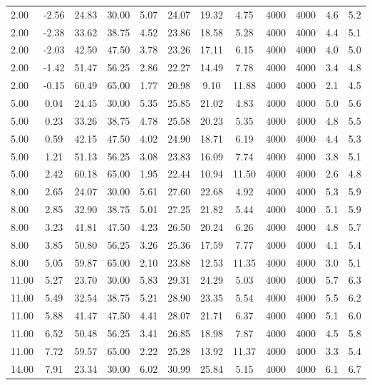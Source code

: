 \documentclass[english]{SPFShortReport}
\begin{document}
\begin{table}[!ht]
\begin{small}
\begin{center}
{\begin{tabular}{l | c c c c c c c c c c c }
2.00 & -2.56 & 24.83 & 30.00 & 5.07 & 24.07 & 19.32 & 4.75 & 4000 & 4000 & 4.6 & 5.2\\ 
2.00 & -2.38 & 33.62 & 38.75 & 4.52 & 23.86 & 18.58 & 5.28 & 4000 & 4000 & 4.4 & 5.1\\ 
2.00 & -2.03 & 42.50 & 47.50 & 3.78 & 23.26 & 17.11 & 6.15 & 4000 & 4000 & 4.0 & 5.0\\ 
2.00 & -1.42 & 51.47 & 56.25 & 2.86 & 22.27 & 14.49 & 7.78 & 4000 & 4000 & 3.4 & 4.8\\ 
2.00 & -0.15 & 60.49 & 65.00 & 1.77 & 20.98 & 9.10 & 11.88 & 4000 & 4000 & 2.1 & 4.5\\ 
5.00 & 0.04 & 24.45 & 30.00 & 5.35 & 25.85 & 21.02 & 4.83 & 4000 & 4000 & 5.0 & 5.6\\ 
5.00 & 0.23 & 33.26 & 38.75 & 4.78 & 25.58 & 20.23 & 5.35 & 4000 & 4000 & 4.8 & 5.5\\ 
5.00 & 0.59 & 42.15 & 47.50 & 4.02 & 24.90 & 18.71 & 6.19 & 4000 & 4000 & 4.4 & 5.3\\ 
5.00 & 1.21 & 51.13 & 56.25 & 3.08 & 23.83 & 16.09 & 7.74 & 4000 & 4000 & 3.8 & 5.1\\ 
5.00 & 2.42 & 60.18 & 65.00 & 1.95 & 22.44 & 10.94 & 11.50 & 4000 & 4000 & 2.6 & 4.8\\ 
8.00 & 2.65 & 24.07 & 30.00 & 5.61 & 27.60 & 22.68 & 4.92 & 4000 & 4000 & 5.3 & 5.9\\ 
8.00 & 2.85 & 32.90 & 38.75 & 5.01 & 27.25 & 21.82 & 5.44 & 4000 & 4000 & 5.1 & 5.9\\ 
8.00 & 3.23 & 41.81 & 47.50 & 4.23 & 26.50 & 20.24 & 6.26 & 4000 & 4000 & 4.8 & 5.7\\ 
8.00 & 3.85 & 50.80 & 56.25 & 3.26 & 25.36 & 17.59 & 7.77 & 4000 & 4000 & 4.1 & 5.4\\ 
8.00 & 5.05 & 59.87 & 65.00 & 2.10 & 23.88 & 12.53 & 11.35 & 4000 & 4000 & 3.0 & 5.1\\ 
11.00 & 5.27 & 23.70 & 30.00 & 5.83 & 29.31 & 24.29 & 5.03 & 4000 & 4000 & 5.7 & 6.3\\ 
11.00 & 5.49 & 32.54 & 38.75 & 5.21 & 28.90 & 23.35 & 5.54 & 4000 & 4000 & 5.5 & 6.2\\ 
11.00 & 5.88 & 41.47 & 47.50 & 4.41 & 28.07 & 21.71 & 6.37 & 4000 & 4000 & 5.1 & 6.0\\ 
11.00 & 6.52 & 50.48 & 56.25 & 3.41 & 26.85 & 18.98 & 7.87 & 4000 & 4000 & 4.5 & 5.8\\ 
11.00 & 7.72 & 59.57 & 65.00 & 2.22 & 25.28 & 13.92 & 11.37 & 4000 & 4000 & 3.3 & 5.4\\ 
14.00 & 7.91 & 23.34 & 30.00 & 6.02 & 30.99 & 25.84 & 5.15 & 4000 & 4000 & 6.1 & 6.7\\ 

\end{tabular}}
\end{center}
\end{small}
\end{table}
\end{document}
